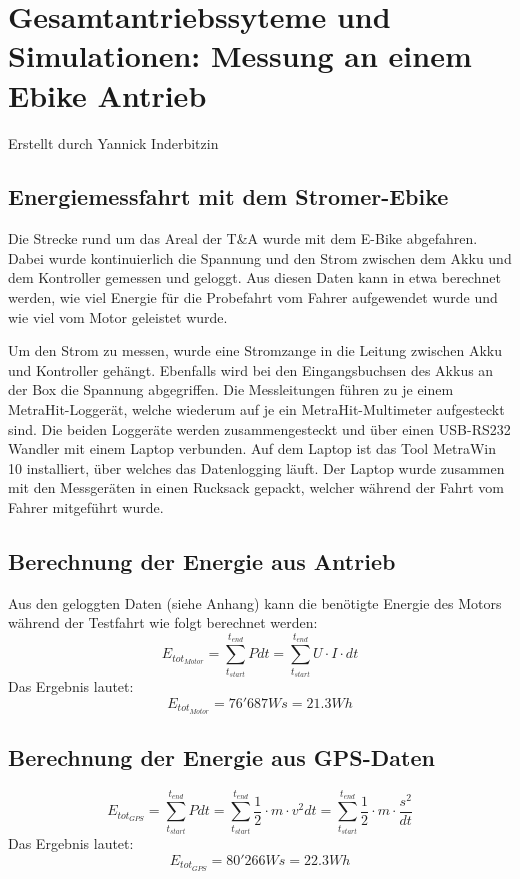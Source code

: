 \documentclass[a4,paper,fleqn]{article}
\begin{document}
\clearpage
\section{Gesamtantriebssyteme und Simulationen: Messung an einem Ebike Antrieb}
Erstellt durch Yannick Inderbitzin

\subsection{Energiemessfahrt mit dem Stromer-Ebike}
Die Strecke rund um das Areal der T\&A wurde mit dem E-Bike abgefahren. Dabei 
wurde kontinuierlich die Spannung und den Strom zwischen dem Akku und dem 
Kontroller gemessen und geloggt. Aus diesen Daten kann in etwa berechnet 
werden, wie viel Energie für die Probefahrt vom Fahrer aufgewendet wurde und 
wie viel vom Motor geleistet wurde.

\noindent
Um den Strom zu messen, wurde eine Stromzange in die Leitung zwischen Akku und 
Kontroller gehängt. Ebenfalls wird bei den Eingangsbuchsen des Akkus an der 
Box die Spannung abgegriffen. Die Messleitungen führen zu je einem 
MetraHit-Loggerät, welche wiederum auf je ein MetraHit-Multimeter aufgesteckt 
sind. Die beiden Loggeräte werden zusammengesteckt und über einen USB-RS232 
Wandler mit einem Laptop verbunden. Auf dem Laptop ist das Tool MetraWin 10 
installiert, über welches das Datenlogging läuft. Der Laptop wurde zusammen 
mit den Messgeräten in einen Rucksack gepackt, welcher während der Fahrt vom 
Fahrer mitgeführt wurde.

\subsection{Berechnung der Energie aus Antrieb}
Aus den geloggten Daten (siehe Anhang) kann die benötigte Energie des Motors 
während der Testfahrt wie folgt berechnet werden:
\[ E_{tot_{Motor}} = \sum\limits_{t_{start}}^{t_{end}} P dt 
= \sum\limits_{t_{start}}^{t_{end}}  U \cdot I \cdot dt \]
Das Ergebnis lautet: 
\[ E_{tot_{Motor}} = 76'687 Ws = 21.3 Wh \]

\subsection{Berechnung der Energie aus GPS-Daten}
\[ E_{tot_{GPS}} = \sum\limits_{t_{start}}^{t_{end}} P dt 
= \sum\limits_{t_{start}}^{t_{end}} \frac{1}{2} \cdot m \cdot v^2 dt
= \sum\limits_{t_{start}}^{t_{end}} \frac{1}{2} \cdot m \cdot \frac{s^2}{dt} \]
Das Ergebnis lautet:
\[ E_{tot_{GPS}} = 80'266Ws = 22.3Wh \]
\end{document}
